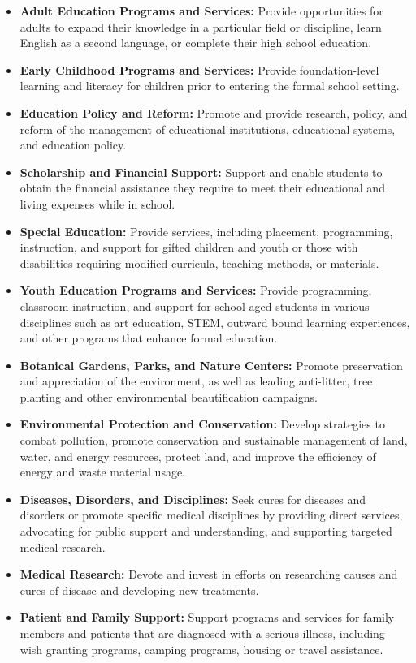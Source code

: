 \begin{itemize}
    \item \textbf{Adult Education Programs and Services:} Provide opportunities for adults to expand their knowledge in a particular field or discipline, learn English as a second language, or complete their high school education.
    \item \textbf{Early Childhood Programs and Services:} Provide foundation-level learning and literacy for children prior to entering the formal school setting.
    \item \textbf{Education Policy and Reform:} Promote and provide research, policy, and reform of the management of educational institutions, educational systems, and education policy.
    \item \textbf{Scholarship and Financial Support:} Support and enable students to obtain the financial assistance they require to meet their educational and living expenses while in school.
    \item \textbf{Special Education:} Provide services, including placement, programming, instruction, and support for gifted children and youth or those with disabilities requiring modified curricula, teaching methods, or materials.
    \item \textbf{Youth Education Programs and Services:} Provide programming, classroom instruction, and support for school-aged students in various disciplines such as art education, STEM, outward bound learning experiences, and other programs that enhance formal education.
    \item \textbf{Botanical Gardens, Parks, and Nature Centers:} Promote preservation and appreciation of the environment, as well as leading anti-litter, tree planting and other environmental beautification campaigns.
    \item \textbf{Environmental Protection and Conservation:} Develop strategies to combat pollution, promote conservation and sustainable management of land, water, and energy resources, protect land, and improve the efficiency of energy and waste material usage.
    \item \textbf{Diseases, Disorders, and Disciplines:} Seek cures for diseases and disorders or promote specific medical disciplines by providing direct services, advocating for public support and understanding, and supporting targeted medical research.
    \item \textbf{Medical Research:} Devote and invest in efforts on researching causes and cures of disease and developing new treatments.
    \item \textbf{Patient and Family Support:} Support programs and services for family members and patients that are diagnosed with a serious illness, including wish granting programs, camping programs, housing or travel assistance.

\end{itemize}
